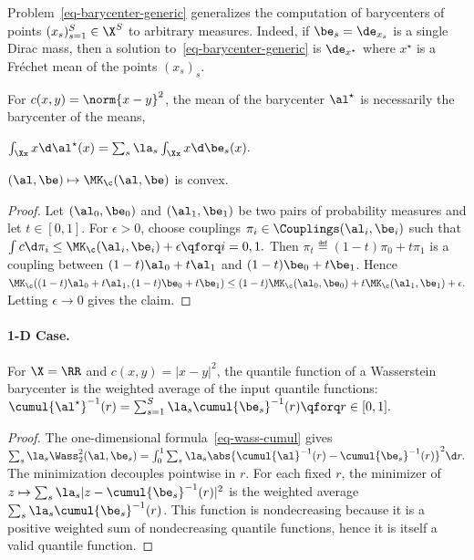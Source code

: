 \begin{rem}
\end{rem}
\begin{example}
Problem~\eqref{eq-barycenter-generic} generalizes the computation of barycenters of points $(x_s)_{s=1}^S \in \X^S$ to arbitrary measures. Indeed, if $\be_s=\de_{x_s}$ is a single Dirac mass, then a solution to~\eqref{eq-barycenter-generic} is $\de_{x^\star}$ where $x^\star$ is a Fr\'echet mean of the points $(x_s)_s$.

\end{example}
\begin{rem}
For $c(x,y)=\norm{x-y}^2$, the mean of the barycenter $\al^\star$ is necessarily the barycenter of the means,

\(\int_\Xx x \d\al^\star(x) = \sum_s \la_s \int_\Xx x \d\be_s(x).\)
\end{rem}
\begin{proposition}
$(\al,\be) \mapsto \MK_{\c}(\al,\be)$ is convex.
\end{proposition}
\begin{proof}
Let $(\al_0,\be_0)$ and $(\al_1,\be_1)$ be two pairs of probability measures and let $t \in [0,1]$. For $\epsilon>0$, choose couplings $\pi_i \in \Couplings(\al_i,\be_i)$ such that
\(\int c \d\pi_i \leq \MK_\c(\al_i,\be_i)+\epsilon \qforq i=0,1.\)
Then $\pi_t \eqdef (1-t)\pi_0+t\pi_1$ is a coupling between $(1-t)\al_0+t\al_1$ and $(1-t)\be_0+t\be_1$. Hence
\(\MK_\c((1-t)\al_0+t\al_1,(1-t)\be_0+t\be_1) \leq (1-t)\MK_\c(\al_0,\be_0)+t\MK_\c(\al_1,\be_1)+\epsilon.\)
Letting $\epsilon \rightarrow 0$ gives the claim.
\end{proof}
\paragraph{1-D Case.}
\begin{prop}
For $\X=\RR$ and $c(x,y)=|x-y|^2$, the quantile function of a Wasserstein barycenter is the weighted average of the input quantile functions:
\(\cumul{\al^\star}^{-1}(r) = \sum_{s=1}^S \la_s \cumul{\be_s}^{-1}(r) \qforq r \in [0,1].\)
\end{prop}
\begin{proof}
The one-dimensional formula~\eqref{eq-wass-cumul} gives \(\sum_s \la_s \Wass_2^2(\al,\be_s) = \int_0^1 \sum_s \la_s \abs{\cumul{\al}^{-1}(r)-\cumul{\be_s}^{-1}(r)}^2 \d r.\)
The minimization decouples pointwise in $r$. For each fixed $r$, the minimizer of
$z \mapsto \sum_s \la_s |z-\cumul{\be_s}^{-1}(r)|^2$
is the weighted average $\sum_s \la_s \cumul{\be_s}^{-1}(r)$. This function is nondecreasing because it is a positive weighted sum of nondecreasing quantile functions, hence it is itself a valid quantile function.
\end{proof}
